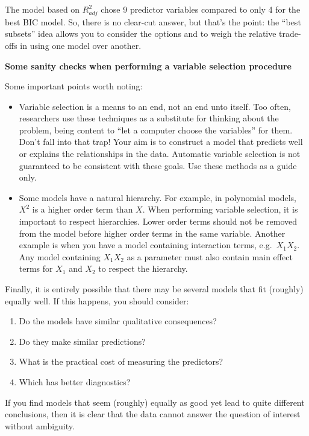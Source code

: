 \documentclass[
]{book}
\providecommand{\tightlist}{%
  \setlength{\itemsep}{0pt}\setlength{\parskip}{0pt}}
\begin{document}
The model based on \(R^2_{adj}\) chose 9 predictor variables compared to only 4 for the best BIC model. So, there is no clear-cut answer, but that's the point: the ``best subsets'' idea allows you to consider the options and to weigh the relative trade-offs in using one model over another.

\textbf{Some sanity checks when performing a variable selection procedure}

Some important points worth noting:

\begin{itemize}
\item
  Variable selection is a means to an end, not an end unto itself. Too often, researchers use these techniques as a substitute for thinking about the problem, being content to ``let a computer choose the variables'' for them. Don't fall into that trap! Your aim is to construct a model that predicts well or explains the relationships in the data. Automatic variable selection is not guaranteed to be consistent with these goals. Use these methods as a guide only.
\item
  Some models have a natural hierarchy. For example, in polynomial models, \(X^2\) is a higher order term than \(X\). When performing variable selection, it is important to respect hierarchies. Lower order terms should not be removed from the model before higher order terms in the same variable. Another example is when you have a model containing interaction terms, e.g.~\(X_1X_2\). Any model containing \(X_1X_2\) as a parameter must also contain main effect terms for \(X_1\) and \(X_2\) to respect the hierarchy.
\end{itemize}

Finally, it is entirely possible that there may be several models that fit (roughly) equally well. If this happens, you should consider:

\begin{enumerate}
\def\labelenumi{\arabic{enumi}.}
\tightlist
\item
  Do the models have similar qualitative consequences?
\item
  Do they make similar predictions?
\item
  What is the practical cost of measuring the predictors?
\item
  Which has better diagnostics?
\end{enumerate}

If you find models that seem (roughly) equally as good yet lead to quite different conclusions, then it is clear that the data cannot answer the question of interest without ambiguity.
\end{document}
